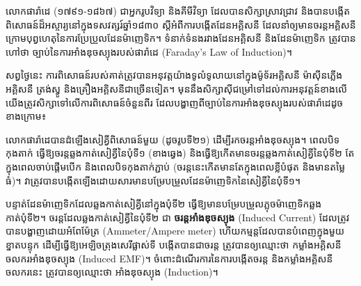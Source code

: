 \clearpage
{}
\tanbgdivider


\noindent
\begin{minipage}[t]{0.55\textwidth}
	\raggedright
	លោកផារ៉ាដេ (១៧៩១-១៨៦៧) ជាអ្នករូបវិទ្យា និងគីមីវិទ្យា ដែលបានសិក្សាស្រាវជ្រាវ និងបានបង្កើតពិសោធន៍ដ៏អស្ចារ្យនៅក្នុងទសវត្សរ៍ឆ្នាំ១៨៣០ ស្តីអំពីការបង្កើតដែនអគ្គិសនី ដែលនាំឲ្យមានចរន្តអគ្គិសនី ក្រោមបុព្វហេតុនៃការប្រែប្រួលដែនម៉ាញេទិក។ ទំនាក់ទំនងរវាងដែនអគ្គិសនី និងដែនម៉ាញេទិក ត្រូវបានហៅថា ច្បាប់នៃការអាំងឌុចស្យុងរបស់ផារ៉ាដេ ({\englishfont Faraday's Law of Induction})។

	សព្វថ្ងៃនេះ ការពិសោធន៍របស់គាត់ត្រូវបានអនុវត្តយ៉ាងទូលំទូលាយនៅក្នុងម៉ូទ័រអគ្គិសនី ម៉ាស៊ីនភ្លើងអគ្គិសនី ត្រង់ស្វូ និងគ្រឿងអគ្គិសនីជាច្រើនទៀត។ មុននឹងសិក្សាស៊ីជម្រៅទៅដល់ការអនុវត្តន៍ខាងលើ យើងត្រូវសិក្សាទៅលើការពិសោធន៍ចំនួនពីរ ដែលបង្ហាញពីច្បាប់នៃការអាំងឌុចស្យុងរបស់ផារ៉ាដេដូចខាងក្រោម៖
\end{minipage}%
\hfill
\begin{minipage}[t]{0.40\textwidth}
	\vspace{0pt}
\end{minipage}

\vspace{0.7em}

\noindent
\begin{minipage}[t]{0.55\textwidth}
	\raggedright
	លោកផារ៉ាដេបានដំឡើងសៀគ្វីពិសោធន៍មួយ (ដូចរូបទី២១) ដើម្បីរកចរន្តអាំងឌុចស្យុង។ ពេលបិទកុងតាក់ ធ្វើឱ្យចរន្តឆ្លងកាត់សៀគ្វីនៃបុំទី១ (ខាងឆ្វេង) និងធ្វើឱ្យកើតមានចរន្តឆ្លងកាត់សៀគ្វីនៃបុំទី២ តែក្នុងពេលចាប់ផ្ដើមបើក និងពេលបិទកុងតាក់ភ្ជាប់ (ចរន្តនេះកើតមានតែក្នុងពេលខ្លីបំផុត និងមានតម្លៃធំ)។ វាត្រូវបានបង្កើតឡើងដោយសារមានបម្រែបម្រួលដែនម៉ាញេទិកនៃសៀគ្វីនៃបុំទី១។

	បន្ទាត់ដែនម៉ាញេទិកដែលឆ្លងកាត់សៀគ្វីនៅក្នុងបុំទី២ ធ្វើឱ្យមានបម្រែបម្រួលភ្លុចម៉ាញេទិកឆ្លងកាត់បុំទី២។ ចរន្តដែលឆ្លងកាត់សៀគ្វីនៃបុំទី២ ជា \textbf{ចរន្តអាំងឌុចស្យុង} ({\englishfont Induced Current}) ដែលត្រូវបានបង្ហាញដោយអំពែម៉ែត្រ (Ammeter/Ampere meter) ហើយកម្មន្តដែលបានបំពេញក្នុងមួយខ្នាតបន្ទុក ដើម្បីធ្វើឱ្យអេឡិចត្រុងសេរីផ្លាស់ទី បង្កើតបានជាចរន្ត ត្រូវបានឲ្យឈ្មោះថា កម្លាំងអគ្គិសនីចលករអាំងឌុចស្យុង ({\englishfont Induced EMF})។ ចំពោះដំណើរការនៃការបង្កើតចរន្ត និងកម្លាំងអគ្គិសនីចលករនេះ ត្រូវបានឲ្យឈ្មោះថា អាំងឌុចស្យុង ({\englishfont Induction})។
\end{minipage}%
\hfill
\begin{minipage}[t]{0.40\textwidth}
	\vspace{0pt}
\end{minipage}

